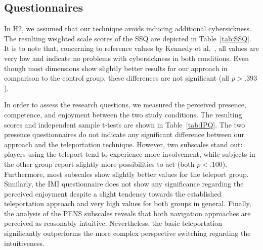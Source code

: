 \documentclass{sigchi}
\begin{document}
\subsection{Questionnaires}
In H2, we assumed that our technique avoids inducing additional cybersickness. The resulting weighted scale scores of the SSQ are depicted in Table~\ref{tab:SSQ}. It is to note that, concerning to reference values by Kennedy et al.~\cite{kennedy1993simulator}, all values are very low and indicate no problems with cybersickness in both conditions. Even though most dimensions show slightly better results for our approach in comparison to the control group, these differences are not significant (all $p>.393$). \par
In order to assess the research questions, we measured the perceived presence, competence, and enjoyment between the two study conditions. The resulting scores and independent sample t-tests are shown in Table~\ref{tab:IPQ}. The two presence questionnaires do not indicate any significant difference between our approach and the teleportation technique. However, two subscales stand out: players using the teleport tend to experience more involvement, while subjects in the other group report slightly more possibilities to act (both $p<.100$). Furthermore, most subscales show slightly better values for the teleport group. Similarly, the IMI questionnaire does not show any significance regarding the perceived enjoyment despite a slight tendency towards the established teleportation approach and very high values for both groups in general. Finally, the analysis of the PENS subscales reveals that both navigation approaches are perceived as reasonably intuitive. Nevertheless, the basic teleportation significantly outperforms the more complex perspective switching regarding the intuitiveness.
\end{document}
